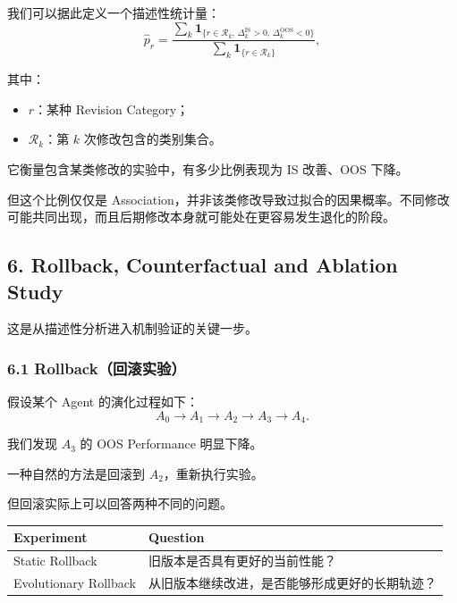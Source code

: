 我们可以据此定义一个描述性统计量：
\[\widehat p_r
=
\frac{
\sum_k
\mathbf 1_{\{
r\in\mathcal R_k,\,
\Delta_k^{\mathrm{IS}}>0,\,
\Delta_k^{\mathrm{OOS}}<0
\}}
}{
\sum_k\mathbf 1_{\{r\in\mathcal R_k\}}
},\]

其中：

\begin{itemize}
\tightlist
\item
  \(r\)：某种 Revision Category；
\item
  \(\mathcal R_k\)：第 \(k\) 次修改包含的类别集合。
\end{itemize}

它衡量包含某类修改的实验中，有多少比例表现为 IS 改善、OOS 下降。

但这个比例仅仅是 Association，并非该类修改导致过拟合的因果概率。不同修改可能共同出现，而且后期修改本身就可能处在更容易发生退化的阶段。

\hypertarget{part-3-48-0001-rollback-counterfactual-and-ablation-study}{%
\subsection{6. Rollback, Counterfactual and Ablation Study}\label{part-3-48-0001-rollback-counterfactual-and-ablation-study}}

这是从描述性分析进入机制验证的关键一步。

\hypertarget{part-3-48-0001-rollbackux56deux6edaux5b9eux9a8c}{%
\subsubsection{6.1 Rollback（回滚实验）}\label{part-3-48-0001-rollbackux56deux6edaux5b9eux9a8c}}

假设某个 Agent 的演化过程如下：
\[A_0\rightarrow A_1\rightarrow
A_2\rightarrow A_3\rightarrow A_4.\]

我们发现 \(A_3\) 的 OOS Performance 明显下降。

一种自然的方法是回滚到 \(A_2\)，重新执行实验。

但回滚实际上可以回答两种不同的问题。

\begin{readertable}
\begin{longtable}[]{@{}
  >{\raggedright\arraybackslash}p{}
  >{\raggedright\arraybackslash}p{}@{}}
\toprule
Experiment & Question \\
\midrule
\endhead
Static Rollback & 旧版本是否具有更好的当前性能？ \\
Evolutionary Rollback & 从旧版本继续改进，是否能够形成更好的长期轨迹？ \\
\bottomrule
\end{longtable}
\end{readertable}

